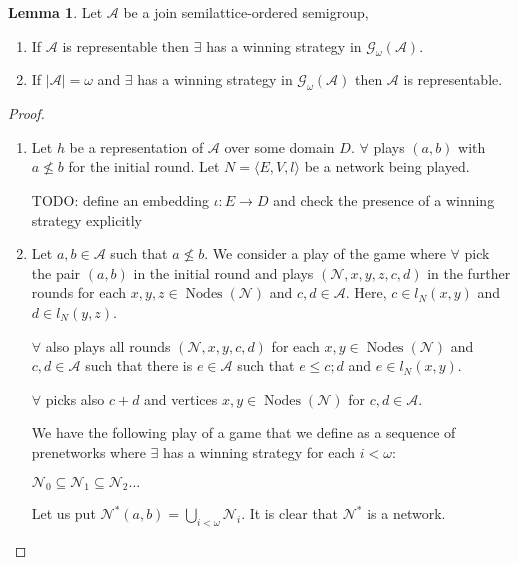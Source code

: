 \documentclass[a4paper]{article}
\theoremstyle{definition}
\theoremstyle{theorem}
\theoremstyle{proposition}
\theoremstyle{lemma}
\newtheorem{lemma}{Lemma}
\theoremstyle{ex}
\theoremstyle{corollary}
\theoremstyle{claim}
\begin{document}
\begin{lemma} Let $\mathcal{A}$ be a join semilattice-ordered semigroup,

  \begin{enumerate}
    \item If $\mathcal{A}$ is representable then $\exists$ has a winning strategy in $\mathcal{G}_{\omega}(\mathcal{A})$.
    \item If $|\mathcal{A}| = \omega$ and $\exists$ has a winning strategy in $\mathcal{G}_{\omega}(\mathcal{A})$ then $\mathcal{A}$ is representable.
  \end{enumerate}
\end{lemma}

\begin{proof}
$ $

  \begin{enumerate}
    \item Let $h$ be a representation of $\mathcal{A}$ over some domain $D$. $\forall$ plays $(a, b)$ with $a \not\leq b$ for the initial round. Let $N = \langle E, V, l \rangle$ be a network being played.

    TODO: define an embedding $\iota : E \to D$ and check the presence of a winning strategy explicitly

    \item Let $a, b \in \mathcal{A}$ such that $a \not\leq b$. We consider a play of the game where $\forall$ pick the pair $(a, b)$ in the initial round and plays $(\mathcal{N},x, y, z, c, d)$ in the further rounds for each $x, y, z \in \operatorname{Nodes}(\mathcal{N})$ and $c,d \in \mathcal{A}$. Here, $c \in l_N(x, y)$ and $d \in l_N(y, z)$.

    $\forall$ also plays all rounds $(\mathcal{N},x,y,c,d)$ for each $x, y \in \operatorname{Nodes}(\mathcal{N})$ and $c,d \in \mathcal{A}$ such that there is $e \in \mathcal{A}$ such that
    $e \leq c ; d$ and $e \in l_N(x,y)$.

    $\forall$ picks also $c + d$ and vertices $x,y \in \operatorname{Nodes}(\mathcal{N})$ for $c, d \in \mathcal{A}$.

    We have the following play of a game that we define as a sequence of prenetworks where $\exists$ has a winning strategy for each $i < \omega$:

    \begin{center}
      $\mathcal{N}_0 \subseteq \mathcal{N}_1 \subseteq \mathcal{N}_2 \dots$
    \end{center}

    Let us put $\mathcal{N}^{*}(a, b) = \bigcup \limits_{i < \omega} \mathcal{N}_i$. It is clear that $\mathcal{N}^{*}$ is a network.


\end{enumerate}
\end{proof}
\end{document}
